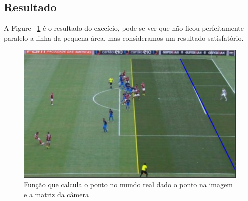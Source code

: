 \documentclass{article}
\begin{document}
    \subsection {Resultado}
    A Figure ~\ref{fig:result2} é o resultado do execício, pode se ver que não ficou perfeitamente paralelo a linha da pequena área, mas consideramos um resultado satisfatório.
        \begin{figure}[h!]
        \centering
        \includegraphics[scale=0.5]{result2.PNG}
        \caption{Função que calcula o ponto no mundo real dado o ponto na imagem e a matriz da câmera}
        \label{fig:result2}
        \end{figure}
\end{document}
